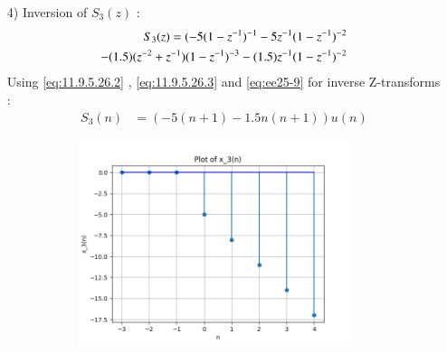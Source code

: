 \documentclass[journal,12pt,twocolumn]{IEEEtran}
\theoremstyle{remark}
\begin{document}
\begin{enumerate}
    \item[4)]
Inversion of $S_3(z)$ :
\begin{align}
    S_3(z) = \notag(-5(1-z^{-1})^{-1} - 5z^{-1}(1-z^{-1})^{-2} \\- (1.5)(z^{-2} + z^{-1})(1-z^{-1})^{-3} - (1.5)z^{-1}(1-z^{-1})^{-2}  
\end{align}
Using \eqref{eq:11.9.5.26.2} , \eqref{eq:11.9.5.26.3} and \eqref{eq:ee25-9} for inverse Z-transforms :
\begin{align}
 S_3(n) &= (-5(n+1) - 1.5n(n+1))u(n)   
\end{align}
\begin{figure}[!ht]   
\centering
\graphicspath{ {figs/} }
\includegraphics[width=10cm, height=6cm]{graph_3}
\captionsetup{Graph:3 $x_3(n)$ vs n }
\label{graph:ee25-g4}
\end{figure}



 
\end{enumerate}
\end{document}
